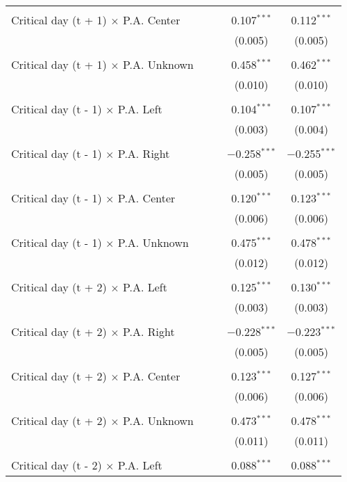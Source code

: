 \documentclass[
]{article}
\begin{document}
\begin{table}[!htbp]
{\begin{tabular}{@{\extracolsep{5pt}}lcccc}
  & & & & \\ 
 Critical day (t + 1) $\times$ P.A. Center &  &  & 0.107$^{***}$ & 0.112$^{***}$ \\ 
  &  &  & (0.005) & (0.005) \\ 
  & & & & \\ 
 Critical day (t + 1) $\times$ P.A. Unknown &  &  & 0.458$^{***}$ & 0.462$^{***}$ \\ 
  &  &  & (0.010) & (0.010) \\ 
  & & & & \\ 
 Critical day (t - 1) $\times$ P.A. Left &  &  & 0.104$^{***}$ & 0.107$^{***}$ \\ 
  &  &  & (0.003) & (0.004) \\ 
  & & & & \\ 
 Critical day (t - 1) $\times$ P.A. Right &  &  & $-$0.258$^{***}$ & $-$0.255$^{***}$ \\ 
  &  &  & (0.005) & (0.005) \\ 
  & & & & \\ 
 Critical day (t - 1) $\times$ P.A. Center &  &  & 0.120$^{***}$ & 0.123$^{***}$ \\ 
  &  &  & (0.006) & (0.006) \\ 
  & & & & \\ 
 Critical day (t - 1) $\times$ P.A. Unknown &  &  & 0.475$^{***}$ & 0.478$^{***}$ \\ 
  &  &  & (0.012) & (0.012) \\ 
  & & & & \\ 
 Critical day (t + 2) $\times$ P.A. Left &  &  & 0.125$^{***}$ & 0.130$^{***}$ \\ 
  &  &  & (0.003) & (0.003) \\ 
  & & & & \\ 
 Critical day (t + 2) $\times$ P.A. Right &  &  & $-$0.228$^{***}$ & $-$0.223$^{***}$ \\ 
  &  &  & (0.005) & (0.005) \\ 
  & & & & \\ 
 Critical day (t + 2) $\times$ P.A. Center &  &  & 0.123$^{***}$ & 0.127$^{***}$ \\ 
  &  &  & (0.006) & (0.006) \\ 
  & & & & \\ 
 Critical day (t + 2) $\times$ P.A. Unknown &  &  & 0.473$^{***}$ & 0.478$^{***}$ \\ 
  &  &  & (0.011) & (0.011) \\ 
  & & & & \\ 
 Critical day (t - 2) $\times$ P.A. Left &  &  & 0.088$^{***}$ & 0.088$^{***}$ \\ 

\end{tabular}}
\end{table}
\end{document}
